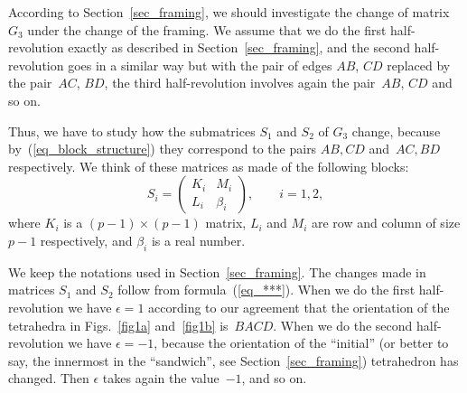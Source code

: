 \documentclass[pdftex]{sigma}
\begin{document}
According to Section~\ref{sec_framing}, we should investigate the change of matrix $G_3$ under the change of the framing. We assume that we do the
f\/irst half-revolution exactly as described in Section~\ref{sec_framing}, and the second half-revolution goes in a similar way but with the pair of
edges $AB$, $CD$ replaced by the pair~$AC$, $BD$, the third half-revolution involves again the pair~$AB$, $CD$ and so on.

Thus, we have to study how the submatrices $S_1$ and $S_2$ of $G_3$ change, because by~(\ref{eq_block_structure}) they correspond to the pairs $AB,CD$ and~$AC,BD$ respectively. We think of these matrices as made of the following blocks:
\begin{equation}
S_i = \left( \begin{array}{cc} K_i & M_i \\ L_i & \beta_i \end{array} \right), \qquad i = 1, 2, \label{eq_Si0}
\end{equation}
where $K_i$ is a $(p-1) \times (p-1)$ matrix, $L_i$ and $M_i$ are row and column of size $p-1$ respectively, and $\beta_i$ is a real number.

We keep the notations used in Section~\ref{sec_framing}. The changes made in matrices $S_1$ and $S_2$ follow from formula~(\ref{eq_***}). When we do the f\/irst half-revolution we have $\epsilon=1$ according to our agreement that the orientation of the tetrahedra in Figs.~\ref{fig1a} and~\ref{fig1b} is~$BACD$. When we do the second half-revolution we have $\epsilon=-1$, because the orientation of the ``initial'' (or better to say, the innermost in the ``sandwich'', see Section~\ref{sec_framing}) tetrahedron has changed. Then $\epsilon$ takes again the value~$-1$, and so on.
\end{document}
